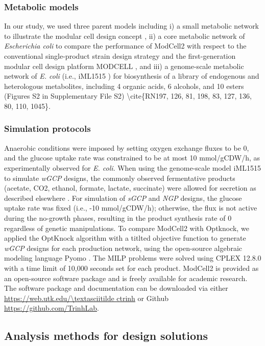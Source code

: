 \subsubsection{Metabolic models} In our study, we used three parent
models including i) a small metabolic network to illustrate the modular
cell design concept \citep{trinh2015}, ii) a core metabolic
network of \emph{Escherichia coli} to compare the performance of
ModCell2 with respect to the conventional single-product strain design
strategy and the first-generation modular cell design platform MODCELL
\citep{trinh2015}, and iii) a genome-scale metabolic network
of \emph{E. coli} (i.e., iML1515 \citep{feist2010}) for
biosynthesis of a library of endogenous and heterologous
metabolites\emph{,} including 4 organic acids, 6 alcohols, and 10 esters
(Figures S2 in Supplementary File S2) \textbackslash{}cite\{RN197, 126,
81, 198, 83, 127, 136, 80, 110, 1045\}.

\subsubsection{Simulation protocols} Anaerobic conditions were imposed
by setting oxygen exchange fluxes to be 0, and the glucose uptake rate
was constrained to be at most 10 mmol/gCDW/h, as experimentally observed
for \emph{E. coli}. When using the genome-scale model iML1515 to
simulate \emph{wGCP} designs, the commonly observed fermentative
products (acetate, CO2, ethanol, formate, lactate, succinate) were
allowed for secretion as described elsewhere
\citep{von2017}. For simulation of \emph{sGCP} and
\emph{NGP} designs, the glucose uptake rate was fixed (i.e., -10
mmol/gCDW/h); otherwise, the flux is not active during the no-growth
phases, resulting in the product synthesis rate of 0 regardless of
genetic manipulations. To compare ModCell2 with Optknock, we applied the
OptKnock algorithm with a titlted objective function
\citep{maranas2016} to generate \emph{wGCP} designs for each
production network, using the open-source algebraic modeling language
Pyomo \citep{hart2012}. The MILP problems were solved using
CPLEX 12.8.0 with a time limit of 10,000 seconds set for each product.
ModCell2 is provided as an open-source software package and is freely
available for academic research. The software package and documentation
can be downloaded via either \url{https://web.utk.edu/\textasciitilde ctrinh} or Github
\url{https://github.com/TrinhLab}.

\subsection{Analysis methods for design
solutions}

